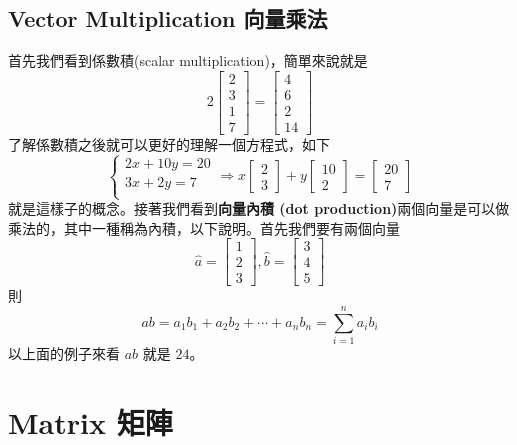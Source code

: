 \documentclass[11pt]{article}
\begin{document}
\subsection{Vector Multiplication 向量乘法}
首先我們看到係數積(scalar multiplication)，簡單來說就是
\[
2\begin{bmatrix} 2 \\ 3 \\ 1 \\ 7 \end{bmatrix} = \begin{bmatrix} 4 \\ 6 \\ 2 \\ 14 \end{bmatrix}
\]
了解係數積之後就可以更好的理解一個方程式，如下
\[
\begin{cases}
  2x + 10y = 20 \\
  3x + 2y = 7 \\
\end{cases}
\Rightarrow
x\begin{bmatrix} 2 \\ 3 \end{bmatrix} + y\begin{bmatrix} 10 \\ 2 \end{bmatrix}
= \begin{bmatrix} 20 \\ 7 \end{bmatrix}
\]
就是這樣子的概念。接著我們看到\textbf{向量內積 (dot production)}兩個向量是可以做乘法的，其中一種稱為內積，以下說明。首先我們要有兩個向量
\[
  \hat{a} = \begin{bmatrix}
    1 \\ 2 \\3
  \end{bmatrix},
  \hat{b} = \begin{bmatrix}
    3 \\ 4 \\5
  \end{bmatrix}
\]
則
\[
  ab = a_1b_1 + a_2b_2 + \cdots + a_nb_n =  \sum_{i=1}^n{a_ib_i}
\]
以上面的例子來看 $ab$ 就是 $24$。
\pagebreak
\section{Matrix 矩陣}
\end{document}
